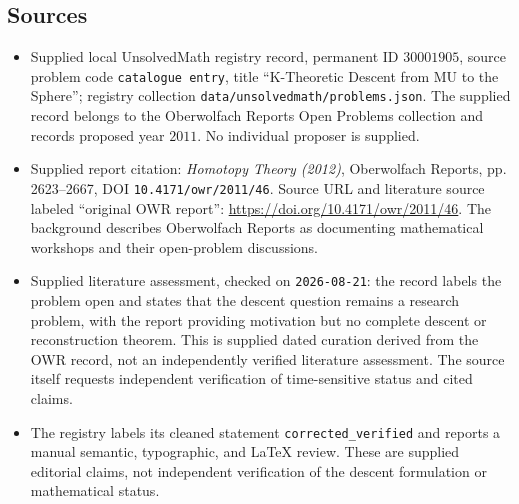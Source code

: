 \documentclass[11pt]{article}
\begin{document}
\subsection{Sources}
\begin{itemize}
\item Supplied local UnsolvedMath registry record, permanent ID \(30001905\), source problem code \texttt{catalogue entry}, title ``K-Theoretic Descent from MU to the Sphere''; registry collection \texttt{data/unsolvedmath/problems.json}. The supplied record belongs to the Oberwolfach Reports Open Problems collection and records proposed year \(2011\). No individual proposer is supplied.
\item Supplied report citation: \emph{Homotopy Theory (2012)}, Oberwolfach Reports, pp. 2623--2667, DOI \texttt{10.4171/owr/2011/46}. Source URL and literature source labeled ``original OWR report'': \url{https://doi.org/10.4171/owr/2011/46}. The background describes Oberwolfach Reports as documenting mathematical workshops and their open-problem discussions.
\item Supplied literature assessment, checked on \texttt{2026-08-21}: the record labels the problem open and states that the descent question remains a research problem, with the report providing motivation but no complete descent or reconstruction theorem. This is supplied dated curation derived from the OWR record, not an independently verified literature assessment. The source itself requests independent verification of time-sensitive status and cited claims.
\item The registry labels its cleaned statement \texttt{corrected\_verified} and reports a manual semantic, typographic, and LaTeX review. These are supplied editorial claims, not independent verification of the descent formulation or mathematical status.
\end{itemize}
\end{document}
